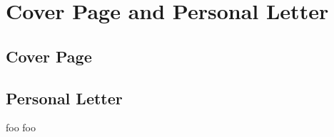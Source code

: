 \chapter{Cover Page and Personal Letter}

\section{Cover Page} \label{sec:cover-page}
\noindent{}%

\clearpage
\section{Personal Letter} \label{sec:personal-letter}
foo foo
